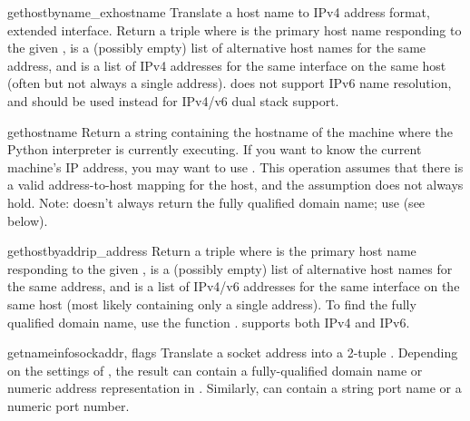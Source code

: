 \begin{funcdesc}{gethostbyname_ex}{hostname}
Translate a host name to IPv4 address format, extended interface.
Return a triple  where
 is the primary host name responding to the given
,  is a (possibly empty) list of
alternative host names for the same address, and  is
a list of IPv4 addresses for the same interface on the same
host (often but not always a single address).
 does not support IPv6 name resolution, and
 should be used instead for IPv4/v6 dual stack support.
\end{funcdesc}

\begin{funcdesc}{gethostname}{}
Return a string containing the hostname of the machine where 
the Python interpreter is currently executing.
If you want to know the current machine's IP address, you may want to use
.
This operation assumes that there is a valid address-to-host mapping for
the host, and the assumption does not always hold.
Note:  doesn't always return the fully qualified
domain name; use 
(see below).
\end{funcdesc}

\begin{funcdesc}{gethostbyaddr}{ip_address}
Return a triple  where  is the primary host name
responding to the given ,  is a
(possibly empty) list of alternative host names for the same address,
and  is a list of IPv4/v6 addresses for the same interface
on the same host (most likely containing only a single address).
To find the fully qualified domain name, use the function
.
 supports both IPv4 and IPv6.
\end{funcdesc}

\begin{funcdesc}{getnameinfo}{sockaddr, flags}
Translate a socket address  into a 2-tuple
.
Depending on the settings of , the result can contain a
fully-qualified domain name or numeric address representation in
.  Similarly,  can contain a string port name or a
numeric port number.
\end{funcdesc}

